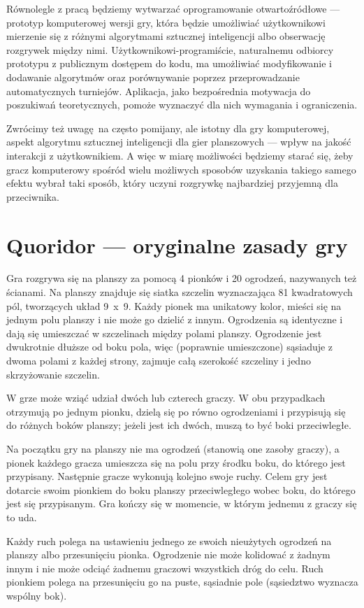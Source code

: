 \documentclass{pracamgr}
\begin{document}
Równolegle z pracą będziemy wytwarzać oprogramowanie otwartoźródłowe --- prototyp komputerowej wersji gry, która będzie umożliwiać użytkownikowi mierzenie się z różnymi algorytmami sztucznej inteligencji albo obserwację rozgrywek między nimi.
Użytkownikowi-programiście, naturalnemu odbiorcy prototypu z publicznym dostępem do kodu, ma umożliwiać modyfikowanie i dodawanie algorytmów oraz porównywanie poprzez przeprowadzanie automatycznych turniejów.
Aplikacja, jako bezpośrednia motywacja do poszukiwań teoretycznych, pomoże wyznaczyć dla nich wymagania i ograniczenia.

Zwrócimy też uwagę na często pomijany, ale istotny dla gry komputerowej, aspekt algorytmu sztucznej inteligencji dla gier planszowych --- wpływ na jakość interakcji z użytkownikiem.
A więc w miarę możliwości będziemy starać się, żeby gracz komputerowy spośród wielu możliwych sposobów uzyskania takiego samego efektu wybrał taki sposób, który uczyni rozgrywkę najbardziej przyjemną dla przeciwnika.

\section{Quoridor --- oryginalne zasady gry}

Gra rozgrywa się na planszy za pomocą 4 pionków i 20 ogrodzeń, nazywanych też ścianami. Na planszy znajduje się siatka szczelin wyznaczająca 81 kwadratowych pól, tworzących układ 9~x~9. Każdy pionek ma unikatowy kolor, mieści się na jednym polu planszy i nie może go dzielić z innym. Ogrodzenia są identyczne i dają się umieszczać w szczelinach między polami planszy. Ogrodzenie jest dwukrotnie dłuższe od boku pola, więc (poprawnie umieszczone) sąsiaduje z dwoma polami z każdej strony, zajmuje całą szerokość szczeliny i jedno skrzyżowanie szczelin.

W grze może wziąć udział dwóch lub czterech graczy. W obu przypadkach otrzymują po jednym pionku, dzielą się po równo ogrodzeniami i przypisują się do różnych boków planszy; jeżeli jest ich dwóch, muszą to być boki przeciwległe.

Na początku gry na planszy nie ma ogrodzeń (stanowią one zasoby graczy), a pionek każdego gracza umieszcza się na polu przy środku boku, do którego jest przypisany.
Następnie gracze wykonują kolejno swoje ruchy. Celem gry jest dotarcie swoim pionkiem do boku planszy przeciwległego wobec boku, do którego jest się przypisanym. Gra kończy się w momencie, w którym jednemu z graczy się to uda.

Każdy ruch polega na ustawieniu jednego ze swoich nieużytych ogrodzeń na planszy albo przesunięciu pionka. Ogrodzenie nie może kolidować z żadnym innym i nie może odciąć żadnemu graczowi wszystkich dróg do celu. Ruch pionkiem polega na przesunięciu go na puste, sąsiadnie pole (sąsiedztwo wyznacza wspólny bok).
\end{document}
